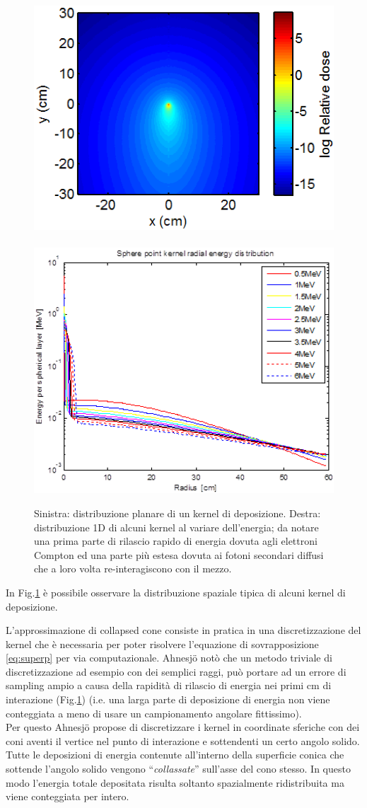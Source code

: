 {\begin{figure}[!t]
\centering
\includegraphics[width=.45\textwidth]{./cap1/kern_ray1.png}$\quad$
\includegraphics[width=.45\textwidth]{./cap1/kern_ray2.png}
\caption{Sinistra: distribuzione planare di un kernel di deposizione. Destra: distribuzione 1D di alcuni kernel al variare dell'energia; da notare una prima parte di rilascio rapido di energia dovuta agli elettroni Compton ed una parte più estesa dovuta ai fotoni secondari diffusi che a loro volta re-interagiscono con il mezzo.}
\label{fig:kern_ray}
\end{figure}
In Fig.\ref{fig:kern_ray} è possibile osservare la distribuzione spaziale tipica di alcuni kernel di deposizione.

\vspace{.2cm}
L'approssimazione di collapsed cone consiste in pratica in una discretizzazione del kernel che è necessaria per poter risolvere l'equazione di sovrapposizione \eqref{eq:superp} per via computazionale. Ahnesj\"{o} notò che un metodo triviale di discretizzazione ad esempio con dei semplici raggi, può portare ad un errore di sampling ampio a causa della rapidità di rilascio di energia nei primi cm di interazione \cite{Ahnesjo1989} (Fig.\ref{fig:kern_ray}) (i.e. una larga parte di deposizione di energia non viene conteggiata a meno di usare un campionamento angolare fittissimo).\\
Per questo Ahnesj\"{o} propose di discretizzare i kernel in coordinate sferiche con dei coni aventi il vertice nel punto di interazione e sottendenti un certo angolo solido. Tutte le deposizioni di energia contenute all'interno della superficie conica che sottende l'angolo solido vengono \textquotedblleft\textit{collassate}\textquotedblright{} sull'asse del cono stesso. In questo modo l'energia totale depositata risulta soltanto spazialmente ridistribuita ma viene conteggiata per intero.

}
